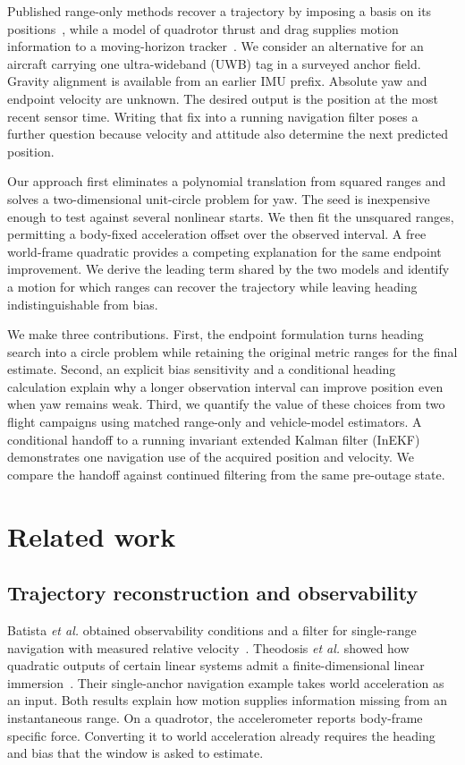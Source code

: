 \documentclass{IEEEtaes}
\begin{document}
Published range-only methods recover a trajectory by imposing a basis on its positions~\cite{pacholska}, while a model of quadrotor thrust and drag supplies motion information to a moving-horizon tracker~\cite{pfeiffer}. We consider an alternative for an aircraft carrying one ultra-wideband (UWB) tag in a surveyed anchor field. Gravity alignment is available from an earlier IMU prefix. Absolute yaw and endpoint velocity are unknown. The desired output is the position at the most recent sensor time. Writing that fix into a running navigation filter poses a further question because velocity and attitude also determine the next predicted position.

Our approach first eliminates a polynomial translation from squared ranges and solves a two-dimensional unit-circle problem for yaw. The seed is inexpensive enough to test against several nonlinear starts. We then fit the unsquared ranges, permitting a body-fixed acceleration offset over the observed interval. A free world-frame quadratic provides a competing explanation for the same endpoint improvement. We derive the leading term shared by the two models and identify a motion for which ranges can recover the trajectory while leaving heading indistinguishable from bias.

We make three contributions. First, the endpoint formulation turns heading search into a circle problem while retaining the original metric ranges for the final estimate. Second, an explicit bias sensitivity and a conditional heading calculation explain why a longer observation interval can improve position even when yaw remains weak. Third, we quantify the value of these choices from two flight campaigns using matched range-only and vehicle-model estimators. A conditional handoff to a running invariant extended Kalman filter (InEKF) demonstrates one navigation use of the acquired position and velocity. We compare the handoff against continued filtering from the same pre-outage state.

\section{Related work}\label{sec:related}
\subsection{Trajectory reconstruction and observability}
Batista \emph{et al.} obtained observability conditions and a filter for single-range navigation with measured relative velocity~\cite{batista}. Theodosis \emph{et al.} showed how quadratic outputs of certain linear systems admit a finite-dimensional linear immersion~\cite{theodosis}. Their single-anchor navigation example takes world acceleration as an input. Both results explain how motion supplies information missing from an instantaneous range. On a quadrotor, the accelerometer reports body-frame specific force. Converting it to world acceleration already requires the heading and bias that the window is asked to estimate.
\end{document}
